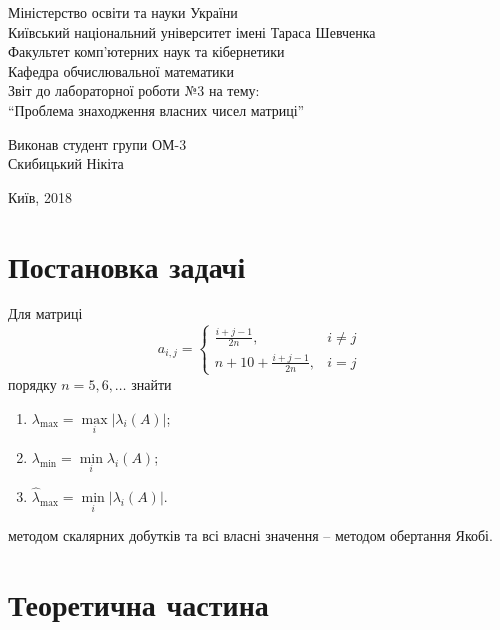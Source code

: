 \documentclass[12pt, a4paper]{article}
\theoremstyle{definition}
\newcommand{\Min}{\displaystyle\min\limits}
\newcommand{\Max}{\displaystyle\max\limits}
\numberwithin{equation}{section}
\begin{document}
\setlength\parindent{0pt}
\allowdisplaybreaks

\begin{center}
\hfill \break
Міністерство освіти та науки України \\
Київський національний університет імені Тараса Шевченка \\ 
Факультет комп'ютерних наук та кібернетики \\
Кафедра обчислювальної математики \\
\vfill 
\large{Звіт до лабораторної роботи №3 на тему: \\ ``Проблема знаходження власних чисел матриці''} \\
\vfill 
\end{center}
\begin{flushright}
Виконав студент групи ОМ-3 \\
Скибицький Нікіта
\end{flushright}
\vfill 
\begin{center}
    Київ, 2018 
\end{center}
\thispagestyle{empty}
 
\newpage

\section{Постановка задачі}

Для матриці \[ a_{i,j} = \begin{cases} \frac{i+j-1}{2n}, & i \ne j \\ n + 10 + \frac{i+j-1}{2n}, & i = j \end{cases} \] порядку $n = 5, 6, \ldots$ знайти 
\begin{enumerate}
	\item $\lambda_{\max} = \Max_i|\lambda_i(A)|$;
	\item $\lambda_{\min} = \Min_i \lambda_i(A)$;
	\item $\hat \lambda_{\max} = \Min_i|\lambda_i(A)|$.
\end{enumerate}
методом скалярних добутків та всі власні значення -- методом обертання Якобі.

\section{Теоретична частина}
\end{document}

